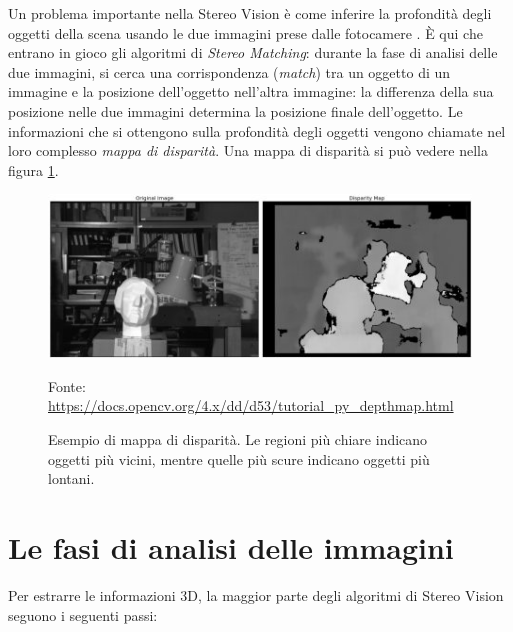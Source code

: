 \documentclass[12pt,a4paper,openright,twoside]{report}
\newcommand{\source}[1]{\vspace{-10pt} \caption*{\scriptsize Fonte: {#1}} }
\begin{document}
Un problema importante nella Stereo Vision è come inferire la profondità degli oggetti della scena usando le due immagini prese dalle fotocamere \cite{imagevideohandbook}. È qui che entrano in gioco gli algoritmi di \textit{Stereo Matching}: durante la fase di analisi delle due immagini, si cerca una corrispondenza (\textit{match}) tra un oggetto di un immagine e la posizione dell'oggetto nell'altra immagine: la differenza della sua posizione nelle due immagini determina la posizione finale dell'oggetto. Le informazioni che si ottengono sulla profondità degli oggetti vengono chiamate nel loro complesso \textit{mappa di disparità}. Una mappa di disparità si può vedere nella figura \ref{img:disparity_map}.

\begin{figure}[h]
    \centering
    \includegraphics[width=\textwidth]{disparity_map.jpg}
    \caption[Esempio di mappa di disparità.]{Esempio di mappa di disparità. Le regioni più chiare indicano oggetti più vicini, mentre quelle più scure indicano oggetti più lontani.}
    \source{\url{https://docs.opencv.org/4.x/dd/d53/tutorial_py_depthmap.html}}
    \label{img:disparity_map}
\end{figure}

\section{Le fasi di analisi delle immagini}

Per estrarre le informazioni 3D, la maggior parte degli algoritmi di Stereo Vision seguono i seguenti passi:
\end{document}
